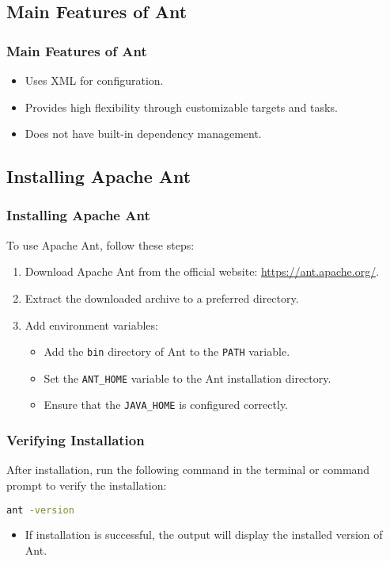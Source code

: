 \documentclass[aspectratio=169, table]{beamer}
\begin{document}
\subsection{Main Features of Ant}

\begin{frame}
	\frametitle{Main Features of Ant}
	\begin{itemize}
		\item Uses XML for configuration.
		\item Provides high flexibility through customizable targets and tasks.
		\item Does not have built-in dependency management.
	\end{itemize}
\end{frame}

\subsection{Installing Apache Ant}

\begin{frame}
	\frametitle{Installing Apache Ant}
	To use Apache Ant, follow these steps:
	\begin{enumerate}
		\item Download Apache Ant from the official website: \url{https://ant.apache.org/}.
		\item Extract the downloaded archive to a preferred directory.
		\item Add environment variables:
		\begin{itemize}
			\item Add the \texttt{bin} directory of Ant to the \texttt{PATH} variable.
			\item Set the \texttt{ANT\_HOME} variable to the Ant installation directory.
			\item Ensure that the \texttt{JAVA\_HOME} is configured correctly.
		\end{itemize}
	\end{enumerate}
\end{frame}

\begin{frame}[fragile]
	\frametitle{Verifying Installation}
	After installation, run the following command in the terminal or command prompt to verify the installation:
	\begin{lstlisting}[language=bash]
		ant -version
	\end{lstlisting}
	\begin{itemize}
		\item If installation is successful, the output will display the installed version of Ant.
	\end{itemize}
\end{frame}
\end{document}
